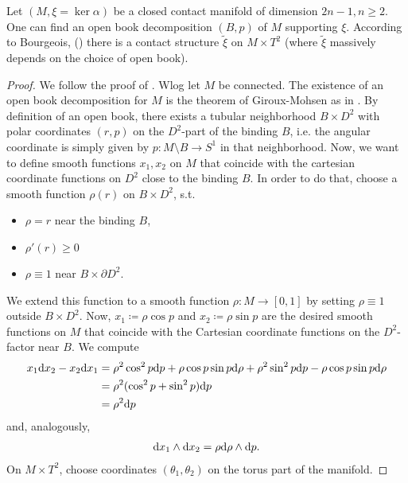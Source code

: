 \begin{theorem}\label{thm:bourgeois}
    Let $(M, \xi = \ker \alpha )$ be a closed contact manifold of dimension $2n - 1, n \geq 2$. One can find an open book decomposition $(B,p)$ of $M$ supporting $\xi$. According to Bourgeois, (\cite{Bourgeois02}) there is a contact structure $\tilde{\xi}$ on $M \times T^2$ (where $\tilde \xi$ massively depends on the choice of open book).
\end{theorem}
\begin{proof}
    We follow the proof of \cite[Thm 7.3.6]{Geiges08}.
    Wlog let $M$ be connected.
    The existence of an open book decomposition for $M$ is the theorem of Giroux-Mohsen as in \cite[Thm 7.3.5]{Geiges08}.
    By definition of an open book, there exists a tubular neighborhood $B \times D^2$ with polar coordinates $(r, p)$ on the $D^2$-part of the binding $B$, i.e. the angular coordinate is simply given by $p: M \setminus B \to S^1$ in that neighborhood.
    Now, we want to define smooth functions $x_1, x_2$ on $M$ that coincide with the cartesian coordinate functions on $D^2$ close to the binding $B$. In order to do that, choose a smooth function $\rho(r)$ on $B \times D^2$, s.t. 
    \begin{itemize}
        \item $\rho = r$ near the binding $B$,
        \item $\rho'(r) \geq 0$
        \item $\rho \equiv 1$ near $B \times \partial D^2$.
    \end{itemize}
    We extend this function to a smooth function $\rho: M \to [0,1]$
    by setting $\rho \equiv 1$ outside $B\times D^2$.
    Now, $x_1 \coloneqq \rho \cos p$ and $x_2 \coloneqq \rho \sin p$ are the desired smooth functions on $M$ that coincide with the Cartesian coordinate functions on the $D^2$-factor near $B$.
    We compute
    \begin{align*}
        x_1 \mathrm{d} x_2 - x_2 \mathrm{d} x_1 &= \rho^2 \cos^2 p \mathrm{d} p + \rho \cos p \sin p \mathrm{d} \rho + \rho^2 \sin^2 p \mathrm{d} p - \rho \cos p \sin p \mathrm{d} \rho\\
        &= \rho^2 (\cos^2 p + \sin^2 p) \mathrm{d} p\\
        &= \rho^2 \mathrm{d} p
    \end{align*}
    and, analogously,
    \begin{align*}
        \mathrm{d} x_1 \wedge \mathrm{d} x_2 = \rho \mathrm{d} \rho \wedge \mathrm{d} p.
    \end{align*}
    On $M\times T^2$, choose coordinates $(\theta_1, \theta_2)$ on the torus part of the manifold.

\end{proof}
